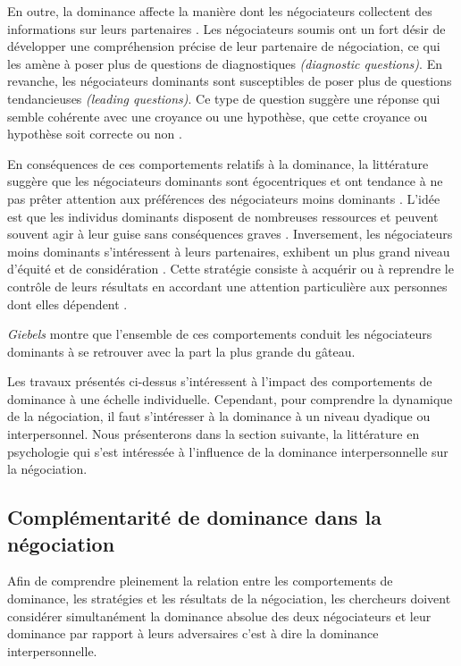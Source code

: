 	 
	 En outre, la dominance affecte la manière dont les négociateurs collectent des informations sur leurs partenaires \cite{de2004influence}. Les négociateurs soumis ont un fort désir de développer une compréhension précise de leur partenaire de négociation, ce qui les amène à poser plus de questions  de diagnostiques \emph {(diagnostic questions)}.
	 En revanche, les négociateurs dominants sont susceptibles de poser plus de questions tendancieuses \emph {(leading questions)}. Ce type de question suggère une réponse  qui semble cohérente avec une croyance ou une hypothèse, que cette croyance ou hypothèse soit correcte ou non \cite{galinsky2003power}.
	
	En conséquences de ces comportements relatifs à la dominance, la littérature suggère que les négociateurs dominants sont égocentriques et ont tendance à ne pas prêter attention aux préférences des négociateurs moins dominants   \cite{fiske1993controlling, de1995impact}. L'idée est que les individus dominants disposent de nombreuses ressources et peuvent souvent agir à leur guise sans conséquences graves \cite{van2006power}. Inversement, les négociateurs moins dominants s'intéressent à leurs partenaires, exhibent un plus grand niveau d'équité et de considération \cite{de1995impact}. Cette stratégie consiste à acquérir ou à reprendre le contrôle de leurs résultats en accordant une attention particulière aux personnes dont elles dépendent \cite{fiske1993controlling}.
	
	\emph{Giebels} \cite{giebels2000interdependence} montre que l'ensemble de ces comportements conduit les négociateurs dominants à se retrouver avec la part la plus grande du gâteau.
	
	Les travaux présentés ci-dessus s'intéressent à l'impact des comportements de dominance à une échelle individuelle. Cependant, pour comprendre la dynamique de la négociation, il faut s'intéresser à la dominance à un niveau dyadique ou interpersonnel. 
	Nous présenterons dans la section suivante, la littérature en psychologie qui s'est intéressée à l'influence de la dominance interpersonnelle sur la négociation. 

	\subsection{Complémentarité de dominance dans la négociation}
	\label{sec:compEtat}
	Afin de comprendre pleinement la relation entre les comportements de dominance, les stratégies et les résultats de la négociation, les chercheurs doivent considérer simultanément la dominance absolue des deux négociateurs et leur dominance par rapport à leurs adversaires c'est à dire la dominance interpersonnelle. 
	
